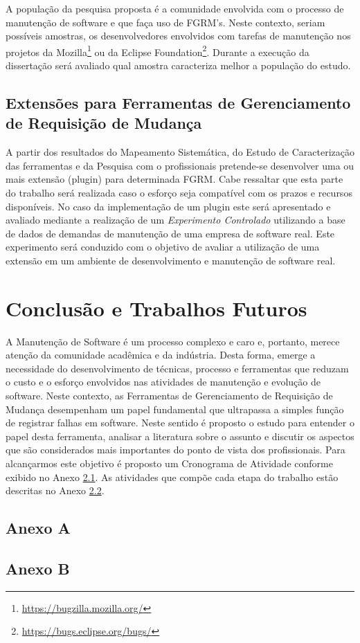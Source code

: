 \documentclass[msc,proposal,hidelot,hideabstract]{ppgccufmg} %
\begin{document}
A população da pesquisa proposta é a comunidade envolvida com o processo de
manutenção de software e que faça uso de FGRM's. Neste contexto, seriam
possíveis amostras, os desenvolvedores envolvidos com tarefas de manutenção nos
projetos da Mozilla\footnote{\url{https://bugzilla.mozilla.org/}} ou da
Eclipse Foundation\footnote{\url{https://bugs.eclipse.org/bugs/}}. Durante a
execução da dissertação será avaliado qual amostra caracteriza melhor a
população do estudo.

\section{Extensões para Ferramentas de Gerenciamento de Requisição de Mudança}
\label{sec:novas-extensoes}

A partir dos resultados do Mapeamento Sistemática, do Estudo de Caracterização das ferramentas e da Pesquisa com o profissionais pretende-se desenvolver uma ou mais extensão (plugin) para determinada FGRM. Cabe ressaltar que esta parte do trabalho será realizada caso o esforço seja compatível com os prazos e recursos disponíveis. No caso da implementação de um plugin este será apresentado e avaliado mediante a realização de um \textit{Experimento Controlado} \cite{wohlin2012experimentation} utilizando a base de dados de demandas de manutenção de uma empresa de software real. Este experimento será conduzido com o objetivo de avaliar a utilização de uma extensão em um ambiente de desenvolvimento e manutenção de software real.

\chapter{Conclusão e Trabalhos Futuros}
\label{ch:conclusao_trab_futuros}

A Manutenção de Software é um processo complexo e caro e, portanto,  merece atenção da
comunidade acadêmica e da indústria. Desta forma, emerge a necessidade do desenvolvimento de técnicas, processo e ferramentas que reduzam o custo e o esforço envolvidos nas atividades de manutenção e evolução de software. Neste contexto, as Ferramentas de Gerenciamento de Requisição de Mudança desempenham um papel fundamental que ultrapassa a simples função de registrar falhas em software. Neste sentido é proposto o estudo para entender o papel desta ferramenta, analisar a literatura sobre o assunto e discutir os aspectos que são considerados mais importantes do ponto de vista dos profissionais. Para alcançarmos este objetivo é proposto um Cronograma de Atividade conforme exibido no Anexo \ref{anexo:cronograma}. As atividades que compõe cada etapa do trabalho estão descritas no Anexo \ref{anexo:atividades}.

\appendix
\section{Anexo A}
\label{anexo:cronograma}




\section{Anexo B}
\label{anexo:atividades}


\end{document}
